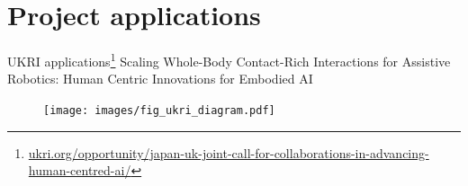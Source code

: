 \documentclass[aspectratio=169]{beamer}
\begin{document}
\section{Project applications}

\begin{frame}{
  UKRI applications\footnote{\href{https://www.ukri.org/opportunity/japan-uk-joint-call-for-collaborations-in-advancing-human-centred-ai/}{ukri.org/opportunity/japan-uk-joint-call-for-collaborations-in-advancing-human-centred-ai/}}
  }{Scaling Whole-Body Contact-Rich Interactions for Assistive Robotics: Human Centric Innovations for Embodied AI}
  \begin{center}
    \begin{figure}
      \texttt{[image: images/fig\_ukri\_diagram.pdf]}
    \end{figure}
  \end{center}
\end{frame}

\begin{frame}
  \maketitle
\end{frame}
\end{document}
